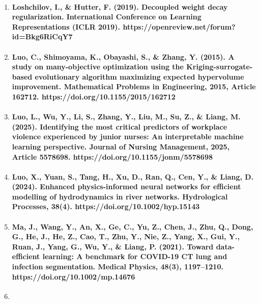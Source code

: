\begin{enumerate}
  \paragraph{Liu, X., Tian, Z., Chen, C., \& Ostadhassan, M. (2021). Total organic carbon content prediction using extreme gradient boosting based on Bayesian optimization. Geofluids, 2021, Article 6155663. https://doi.org/10.1155/2021/6155663}
\item
  \paragraph{Loshchilov, I., \& Hutter, F. (2019). Decoupled weight decay regularization. International Conference on Learning Representations (ICLR 2019). https://openreview.net/forum?id=Bkg6RiCqY7}
\item
  \paragraph{Luo, C., Shimoyama, K., Obayashi, S., \& Zhang, Y. (2015). A study on many-objective optimization using the Kriging-surrogate-based evolutionary algorithm maximizing expected hypervolume improvement. Mathematical Problems in Engineering, 2015, Article 162712. https://doi.org/10.1155/2015/162712}
\item
  \paragraph{Luo, L., Wu, Y., Li, S., Zhang, Y., Liu, M., Su, Z., \& Liang, M. (2025). Identifying the most critical predictors of workplace violence experienced by junior nurses: An interpretable machine learning perspective. Journal of Nursing Management, 2025, Article 5578698. https://doi.org/10.1155/jonm/5578698}
\item
  \paragraph{Luo, X., Yuan, S., Tang, H., Xu, D., Ran, Q., Cen, Y., \& Liang, D. (2024). Enhanced physics-informed neural networks for efficient modelling of hydrodynamics in river networks. Hydrological Processes, 38(4). https://doi.org/10.1002/hyp.15143}
\item
  \paragraph{Ma, J., Wang, Y., An, X., Ge, C., Yu, Z., Chen, J., Zhu, Q., Dong, G., He, J., He, Z., Cao, T., Zhu, Y., Nie, Z., Yang, X., Gui, Y., Ruan, J., Yang, G., Wu, Y., \& Liang, P. (2021). Toward data-efficient learning: A benchmark for COVID-19 CT lung and infection segmentation. Medical Physics, 48(3), 1197–1210. https://doi.org/10.1002/mp.14676}
\item

\end{enumerate}
